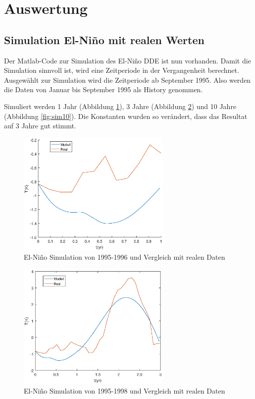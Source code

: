 \section{Auswertung}
\subsection{Simulation El-Niño mit realen Werten}
Der Matlab-Code zur Simulation des El-Niño DDE ist nun vorhanden.
Damit die Simulation sinnvoll ist, wird eine Zeitperiode in der Vergangenheit berechnet.
Ausgewählt zur Simulation wird die Zeitperiode ab September 1995. 
Also werden die Daten von Januar bis September 1995 als History genommen.

Simuliert werden 1 Jahr (Abbildung \ref{fig:sim1}), 3 Jahre (Abbildung \ref{fig:sim3}) und 10 Jahre (Abbildung \ref{fig:sim10}). 
Die Konstanten wurden so verändert, dass das Resultat auf 3 Jahre gut stimmt.
\begin{figure}
	\centering
	\includegraphics[width=0.66\textwidth,height=0.33\textheight]{verzoegert/inp/figures/sim_1.eps}
	\caption{El-Niño Simulation von 1995-1996 und Vergleich mit realen Daten}
	\label{fig:sim1}
\end{figure}
\begin{figure}
	\centering
	\includegraphics[width=0.66\textwidth,height=0.33\textheight]{verzoegert/inp/figures/sim_3.eps}
	\caption{El-Niño Simulation von 1995-1998 und Vergleich mit realen Daten}
	\label{fig:sim3}
\end{figure}
